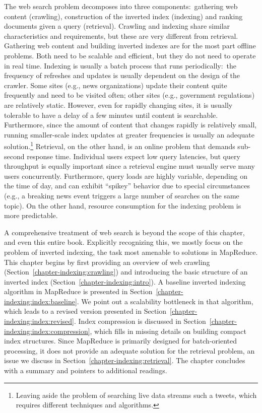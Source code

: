 The web search problem decomposes into three components:\ gathering
web content (crawling), construction of the inverted index (indexing)
and ranking documents given a query (retrieval).  Crawling and
indexing share similar characteristics and requirements, but these are
very different from retrieval.  Gathering web content and building
inverted indexes are for the most part offline problems.  Both need to
be scalable and efficient, but they do not need to operate in real
time.  Indexing is usually a batch process that runs
periodically:\ the frequency of refreshes and updates is usually
dependent on the design of the crawler.  Some sites (e.g., news
organizations) update their content quite frequently and need to be
visited often; other sites (e.g., government regulations) are
relatively static.  However, even for rapidly changing sites, it is
usually tolerable to have a delay of a few minutes until content is
searchable.  Furthermore, since the amount of content that changes
rapidly is relatively small, running smaller-scale index updates at
greater frequencies is usually an adequate solution.\footnote{Leaving
  aside the problem of searching live data streams such a tweets,
  which requires different techniques and algorithms.} Retrieval, on
the other hand, is an online problem that demands sub-second response
time.  Individual users expect low query latencies, but query
throughput is equally important since a retrieval engine must usually
serve many users concurrently.  Furthermore, query loads are highly
variable, depending on the time of day, and can exhibit ``spikey''
behavior due to special circumstances (e.g., a breaking news event
triggers a large number of searches on the same topic).  On the other
hand, resource consumption for the indexing problem is more
predictable.

A comprehensive treatment of web search is beyond the scope of this
chapter, and even this entire book.  Explicitly recognizing this, we
mostly focus on the problem of inverted indexing, the task most
amenable to solutions in MapReduce.  This chapter begins by first
providing an overview of web crawling
(Section~\ref{chapter-indexing:crawling}) and introducing the basic
structure of an inverted index (Section~\ref{chapter-indexing:intro}).
A baseline inverted indexing algorithm in MapReduce is presented in
Section~\ref{chapter-indexing:index:baseline}.  We point out a
scalability bottleneck in that algorithm, which leads to a revised
version presented in Section~\ref{chapter-indexing:index:revised}.
Index compression is discussed in
Section~\ref{chapter-indexing:index:compression}, which fills in
missing details on building compact index structures.  Since MapReduce
is primarily designed for batch-oriented processing, it does not
provide an adequate solution for the retrieval problem, an issue we
discuss in Section~\ref{chapter-indexing:retrieval}.  The chapter
concludes with a summary and pointers to additional readings.

